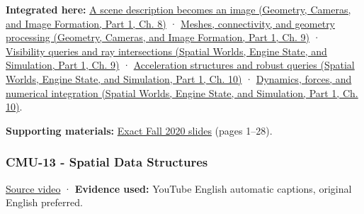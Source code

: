 \textbf{Integrated here:} \href{../03-Geometry-Cameras-and-Image-Formation-P01/main.pdf\#03-visual-computing-i-ch001-a-scene-description-becomes-an-image}{A scene description becomes an image (Geometry, Cameras, and Image Formation, Part 1, Ch. 8)} · \href{../03-Geometry-Cameras-and-Image-Formation-P01/main.pdf\#03-visual-computing-i-ch002-meshes-connectivity-and-geometry-processing}{Meshes, connectivity, and geometry processing (Geometry, Cameras, and Image Formation, Part 1, Ch. 9)} · \href{../05-Spatial-Worlds-Engine-State-and-Simulation-P01/main.pdf\#04-visual-computing-ii-ch028-visibility-queries-and-ray-intersections-1}{Visibility queries and ray intersections (Spatial Worlds, Engine State, and Simulation, Part 1, Ch. 9)} · \href{../05-Spatial-Worlds-Engine-State-and-Simulation-P01/main.pdf\#04-visual-computing-ii-ch029-acceleration-structures-and-robust-queries-1}{Acceleration structures and robust queries (Spatial Worlds, Engine State, and Simulation, Part 1, Ch. 10)} · \href{../05-Spatial-Worlds-Engine-State-and-Simulation-P01/main.pdf\#04-visual-computing-ii-ch029-dynamics-forces-and-numerical-integration}{Dynamics, forces, and numerical integration (Spatial Worlds, Engine State, and Simulation, Part 1, Ch. 10)}.

\textbf{Supporting materials:} \href{https://15462.courses.cs.cmu.edu/fall2020content/lectures/12_geometricqueries/12_geometricqueries_slides.pdf}{Exact Fall 2020 slides} (pages 1--28).

\subsubsection{CMU-13 - Spatial Data Structures}\label{04-visual-computing-ii-ch036-cmu-13---spatial-data-structures}

\hypertarget{04-visual-computing-ii-ch036-cmu-13---spatial-data-structures}{}

\href{https://www.youtube.com/watch?v=NF7r-pC8fFc}{Source video} · \textbf{Evidence used:} YouTube English automatic captions, original English preferred.

